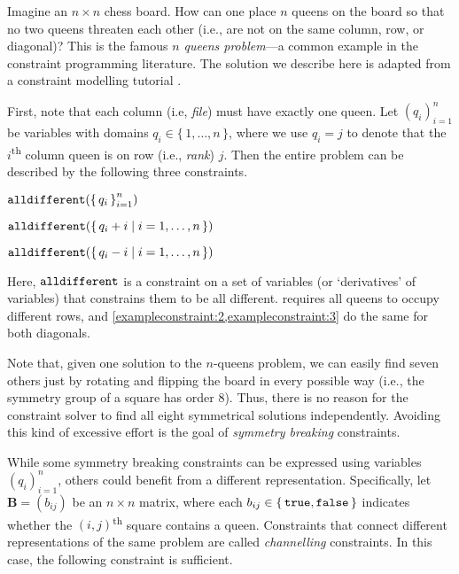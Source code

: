 \begin{example}[$n$ queens]
  Imagine an $n \times n$ chess board. How can one place $n$ queens on the board
  so that no two queens threaten each other (i.e., are not on the same column,
  row, or diagonal)? This is the famous \emph{$n$ queens problem}---a common
  example in the constraint programming literature. The solution we describe
  here is adapted from a constraint modelling tutorial \citep{minizinc}.

  First, note that each column (i.e, \emph{file}) must have exactly one queen.
  Let ${(q_i)}_{i=1}^n$ be variables with domains
  $q_i \in \{\, 1, \dots, n \,\}$, where we use $q_i = j$ to denote that the
  $i$\textsuperscript{th} column queen is on row (i.e., \emph{rank}) $j$. Then
  the entire problem can be described by the following three constraints.

  \begin{constraint}\label{exampleconstraint:1}
    $\operatorname{\mathtt{alldifferent}}({\{\, q_i \,\}}_{i=1}^n)$
  \end{constraint}

  \begin{constraint}\label{exampleconstraint:2}
    $\operatorname{\mathtt{alldifferent}}(\{\, q_i + i \mid i = 1, \dots, n \,\})$
  \end{constraint}

  \begin{constraint}\label{exampleconstraint:3}
    $\operatorname{\mathtt{alldifferent}}(\{\, q_i - i \mid i = 1, \dots, n \,\})$
  \end{constraint}

  Here, $\operatorname{\mathtt{alldifferent}}$ is a constraint on a set of variables (or `derivatives'
  of variables) that constrains them to be all different.
   requires all queens to occupy different rows, and
  \cref{exampleconstraint:2,exampleconstraint:3} do the same for both diagonals.

  Note that, given one solution to the $n$-queens problem, we can easily find
  seven others just by rotating and flipping the board in every possible way
  (i.e., the symmetry group of a square has order 8). Thus, there is no reason
  for the constraint solver to find all eight symmetrical solutions
  independently. Avoiding this kind of excessive effort is the goal of
  \emph{symmetry breaking} constraints.

  While some symmetry breaking constraints can be expressed using variables
  ${(q_i)}_{i=1}^n$, others could benefit from a different representation.
  Specifically, let $\mathbf{B} = (b_{ij})$ be an $n \times n$ matrix, where
  each $b_{ij} \in \{\, \texttt{true}{}, \texttt{false}{} \,\}$ indicates whether the
  $(i,j)$\textsuperscript{th} square contains a queen. Constraints that connect
  different representations of the same problem are called \emph{channelling}
  constraints. In this case, the following constraint is sufficient.


\end{example}
